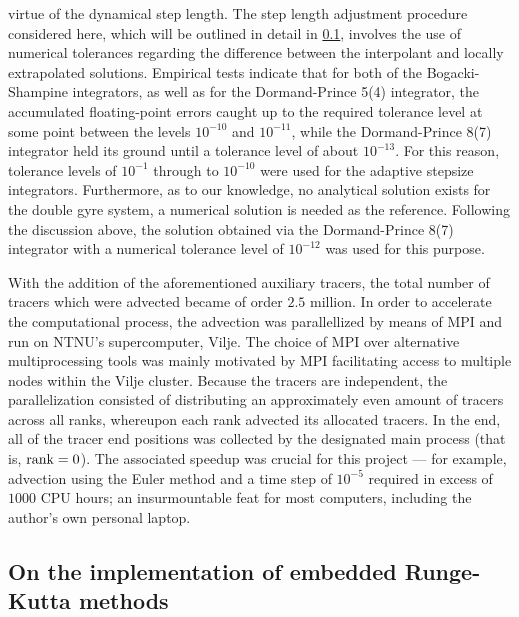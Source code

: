 virtue of the dynamical step length. The step length adjustment procedure
considered here, which will be outlined in detail in
\cref{sub:on_the_implementation_of_embedded_runge_kutta_methods}, involves
the use of numerical tolerances regarding the difference between the interpolant
and locally extrapolated solutions. Empirical tests indicate that for both of the
Bogacki-Shampine integrators, as well as for the Dormand-Prince 5(4) integrator,
the accumulated floating-point errors caught up to the required tolerance level
at some point between the levels $10^{-10}$ and $10^{-11}$, while the
Dormand-Prince 8(7) integrator held its ground until a tolerance level of about
$10^{-13}$. For this reason, tolerance levels of $10^{-1}$ through to $10^{-10}$
were used for the adaptive stepsize integrators. Furthermore, as to our
knowledge, no analytical solution exists for the double gyre system, a numerical
solution is needed as the reference. Following the discussion above, the
solution obtained via the Dormand-Prince 8(7) integrator with a numerical
tolerance level of $10^{-12}$ was used for this purpose.

With the addition of the aforementioned auxiliary tracers, the total number
of tracers which were advected became of order $2.5$ million. In order to
accelerate the computational process, the advection was parallellized by means
of MPI and run on NTNU's supercomputer, Vilje. The choice of MPI over
alternative multiprocessing tools was mainly motivated by MPI facilitating
access to multiple nodes within the Vilje cluster. Because the tracers are
independent, the parallelization consisted of distributing an approximately
even amount of tracers across all ranks, whereupon each rank advected its
allocated tracers. In the end, all of the tracer end positions was collected
by the designated main process (that is, $\textnormal{rank}=0$). The
associated speedup was crucial for this project --- for example, advection using
the Euler method and a time step of $10^{-5}$ required in excess of $1000$
CPU hours; an insurmountable feat for most computers, including the author's own
personal laptop.
\clearpage
\subsection{On the implementation of embedded Runge-Kutta methods}
\label{sub:on_the_implementation_of_embedded_runge_kutta_methods}

